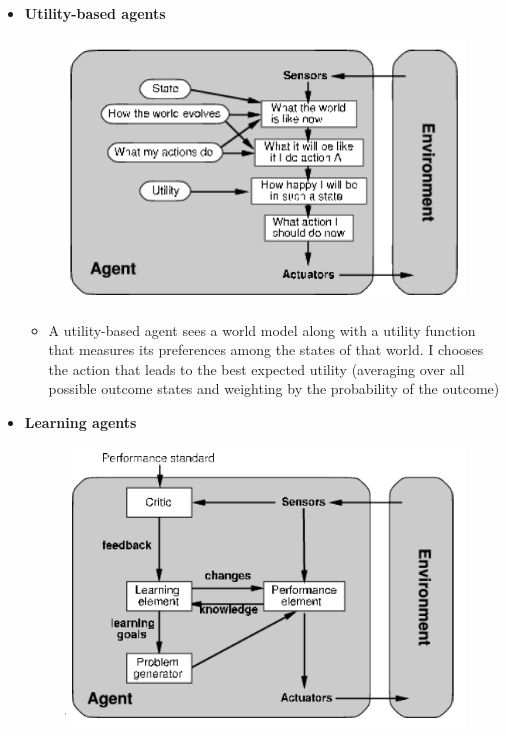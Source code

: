 \documentclass{scrartcl}
\begin{document}
\begin{itemize}
    \item
        \textbf{Utility-based agents}
        \begin{figure}[H]
            \centering
            \includegraphics[scale=1]{figures/49}
        \end{figure}
        \begin{itemize}
            \item
                A utility-based agent sees a world model along with a utility function that measures its preferences among the states of that world. I chooses the action that leads to the best expected utility (averaging over all possible outcome states and weighting by the probability of the outcome)
        \end{itemize}
    \item
        \textbf{Learning agents}
        \begin{figure}[H]
            \centering
            \includegraphics[scale=1]{figures/50}

\end{figure}
\end{itemize}
\end{document}
